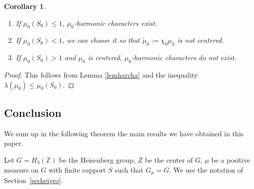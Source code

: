 \documentclass[11pt]{article}
\newcommand{\skpt}{\smallskip}
\numberwithin{equation}{section}
\newenvironment{enumeratea}
{\bgroup\def\theenumi{\alph{enumi}}\begin{enumerate}}
{\end{enumerate}\egroup}
\newtheorem{Cor}[Thm]{Corollary}
\theoremstyle{definition}
\newcommand{\m}[1]{\mathbb{ #1}}
\let\la\lambda
\let\bq\relax
\let\eq\relax
\begin{document}
\skpt
\begin{Cor}
\label{corharcha}
\begin{enumeratea}
\item
If $\mu_0(S_0)\leq 1$, $\mu_0$-harmonic characters exist.
\item
If $\mu_0(S_0)< 1$, we can choose it so that
$\widetilde{\mu}_0:=\chi_0\mu_0$ is not centered.
\item
If $\mu_0(S_0)>1$ and $\mu_0$ is centered, $\mu_0$-harmonic characters do not exist.
\end{enumeratea}
\end{Cor}

\begin{proof}
This follows from Lemma \ref{lemharcha} and the inequality $\la(\mu_0)\leq \mu_0(S_0)$.
\end{proof}

\subsection{Conclusion}
\label{secconclu}
\bq
We sum up in the following theorem
the main results we have obtained in this paper.
\eq

Let $G=H_3(\m Z)$ be the Heisenberg group,
$Z$ be the center of $G$, $\mu$ be a positive measure on $G$ with finite support $S$
such that $G_\mu=G$. We use the notation of Section~\ref{secheigro}.
\end{document}
